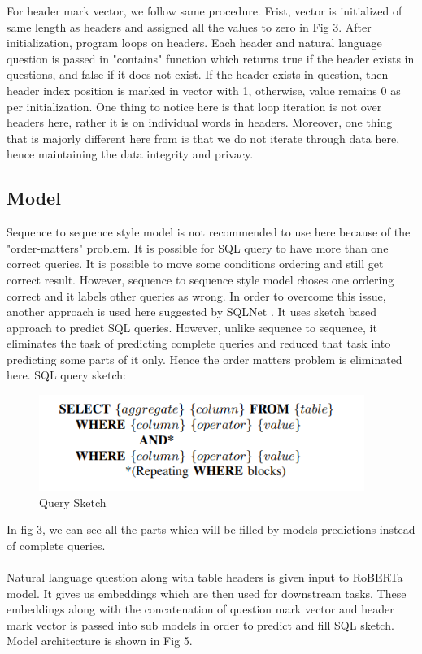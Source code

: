 \documentclass[12pt]{article}
\begin{document}
For header mark vector, we follow same procedure. Frist, vector is initialized of same length as headers and assigned all the values to zero in Fig 3. After initialization, program loops on headers. Each header and natural language question is passed in "contains" function which returns true if the header exists in questions, and false if it does not exist. If the header exists in question, then header index position is marked in vector with 1, otherwise, value remains 0 as per initialization. One thing to notice here is that loop iteration is not over headers here, rather it is on individual words in headers. Moreover, one thing that is majorly different here from \cite{guo2019content} is that we do not iterate through data here, hence maintaining the data integrity and privacy.
 

\subsection{Model}
Sequence to sequence style model is not recommended to use here because of the "order-matters" problem. It is possible for SQL query to have more than one correct queries. It is possible to move some conditions ordering and still get correct result. However, sequence to sequence style model choses one ordering correct and it labels other queries as wrong. In order to overcome this issue, another approach is used here suggested by SQLNet \cite{xu2017sqlnet}. It uses sketch based approach to predict SQL queries. However, unlike sequence to sequence, it eliminates the task of predicting complete queries and reduced that task into predicting some parts of it only. Hence the order matters problem is eliminated here. SQL query sketch:
 
\begin{figure}[H]
    \includegraphics[width=300pt]{sketch}
    \caption{Query Sketch}
    \label{fig:Query Sketch}
\end{figure}

In fig 3, we can see all the parts which will be filled by models predictions instead of complete queries. 
\\
\\
Natural language question along with table headers is given input to RoBERTa model. It gives us embeddings which are then used for downstream tasks.  These embeddings along with the concatenation of question mark vector and header mark vector is passed into sub models in order to predict and fill SQL sketch. Model architecture is shown in Fig 5. 
\end{document}
